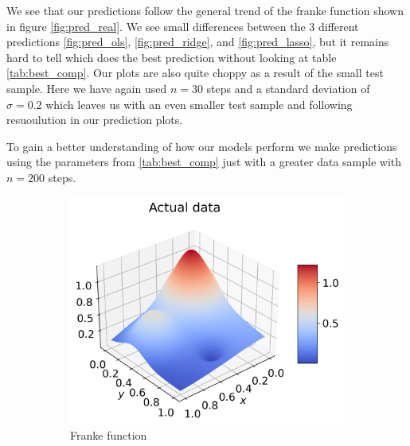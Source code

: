 \documentclass[12pt]{article}
\begin{document}
We see that our predictions follow the general trend of the franke function shown in figure \ref{fig:pred_real}. We see small differences between the 3 different predictions \ref{fig:pred_ols}, \ref{fig:pred_ridge}, and \ref{fig:pred_lasso}, but it remains hard to tell which does the best prediction without looking at table \ref{tab:best_comp}. Our plots are also quite choppy as a result of the small test sample. Here we have again used $n=30$ steps and a standard deviation of $\sigma=0.2$ which leaves us with an even smaller test sample and following resuoulution in our prediction plots.

To gain a better understanding of how our models perform we make predictions using the parameters from \ref{tab:best_comp} just with a greater data sample with $n=200$ steps.
\begin{figure}[H]
  \begin{subfigure}{.5\textwidth}
    \centering
    \includegraphics[width=\textwidth]{../figures/actual_data_franke_extra.png}
    \caption{Franke function}
    \label{fig:extra_pred_real}
  \end{subfigure}
  \begin{subfigure}{.5\textwidth}
    \centering

\end{subfigure}
\end{figure}
\end{document}
